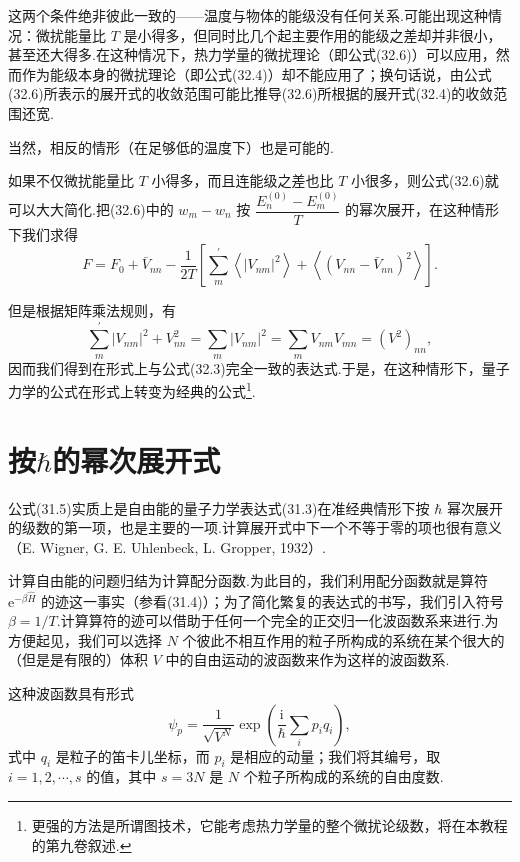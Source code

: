 这两个条件绝非彼此一致的——温度与物体的能级没有任何关系.可能出现这种情况：微扰能量比 $T$ 是小得多，但同时比几个起主要作用的能级之差却并非很小，甚至还大得多.在这种情况下，热力学量的微扰理论（即公式(32.6)）可以应用，然而作为能级本身的微扰理论（即公式(32.4)）却不能应用了；换句话说，由公式(32.6)所表示的展开式的收敛范围可能比推导(32.6)所根据的展开式(32.4)的收敛范围还宽.

当然，相反的情形（在足够低的温度下）也是可能的.

如果不仅微扰能量比 $T$ 小得多，而且连能级之差也比 $T$ 小很多，则公式(32.6)就可以大大简化.把(32.6)中的 $w_m-w_n$ 按 $\dfrac{E_n^{(0)}-E_m^{(0)}}{T}$ 的幂次展开，在这种情形下我们求得
\begin{equation*}
  F=F_0+\bar{V}_{nn}
  -\frac{1}{2T}\left[\sum_m^{\prime}\left\langle|V_{nm}|^2\right\rangle
  +\left\langle(V_{nn}-\bar{V}_{nn})^2\right\rangle\right].
\end{equation*}

但是根据矩阵乘法规则，有
\begin{equation*}
  \sum_m^{\prime}|V_{nm}|^2+V_{nn}^2=\sum_m|V_{nm}|^2
  =\sum_mV_{nm}V_{mn}=\left(V^2\right)_{nn},
\end{equation*}
因而我们得到在形式上与公式(32.3)完全一致的表达式.于是，在这种情形下，量子力学的公式在形式上转变为经典的公式\footnote{更强的方法是所谓图技术，它能考虑热力学量的整个微扰论级数，将在本教程的第九卷叙述.}.

\section{按$\hbar$的幂次展开式}

公式(31.5)实质上是自由能的量子力学表达式(31.3)在准经典情形下按 $\hbar$ 幂次展开的级数的第一项，也是主要的一项.计算展开式中下一个不等于零的项也很有意义（E. Wigner, G. E. Uhlenbeck, L. Gropper, 1932）.

计算自由能的问题归结为计算配分函数.为此目的，我们利用配分函数就是算符 $\mathrm{e}^{-\beta\hat{H}}$ 的迹这一事实（参看(31.4)）；为了简化繁复的表达式的书写，我们引入符号 $\beta=1/T$.计算算符的迹可以借助于任何一个完全的正交归一化波函数系来进行.为方便起见，我们可以选择 $N$ 个彼此不相互作用的粒子所构成的系统在某个很大的（但是是有限的）体积 $V$ 中的自由运动的波函数来作为这样的波函数系.

这种波函数具有形式
\begin{equation}
  \psi_p=\frac{1}{\sqrt{V^N}}\exp\left(\frac{\mathrm{i}}{\hbar}\sum_ip_iq_i\right),
\end{equation}
式中 $q_i$ 是粒子的笛卡儿坐标，而 $p_i$ 是相应的动量；我们将其编号，取 $i=1,2,\cdots,s$ 的值，其中 $s=3N$ 是 $N$ 个粒子所构成的系统的自由度数.

